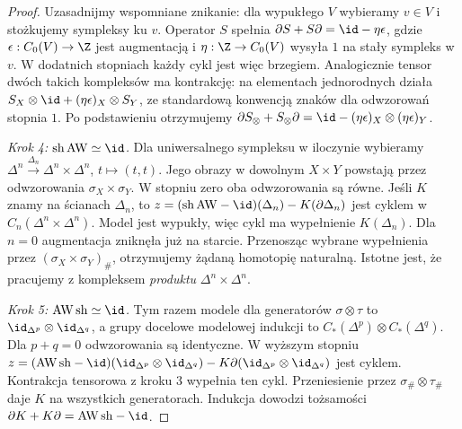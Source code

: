 \begin{proof}
Uzasadnijmy wspomniane znikanie: dla wypukłego $V$ wybieramy
$v\in V$ i stożkujemy sympleksy ku $v$. Operator $S$ spełnia
$\partial S+S\partial=\id-\eta\epsilon$, gdzie
$\epsilon:C_0(V)\to\Z$ jest augmentacją i
$\eta:\Z\to C_0(V)$ wysyła $1$ na stały sympleks w $v$.
W dodatnich stopniach każdy cykl jest więc brzegiem.
Analogicznie tensor dwóch takich kompleksów ma kontrakcję:
na elementach jednorodnych działa
$S_X\otimes\id+(\eta\epsilon)_X\otimes S_Y$,
ze standardową konwencją znaków dla odwzorowań stopnia $1$.
Po podstawieniu otrzymujemy
$\partial S_{\otimes}+S_{\otimes}\partial
=\id-(\eta\epsilon)_X\otimes(\eta\epsilon)_Y$.

\emph{Krok 4: $\mathrm{sh}\,\mathrm{AW}\simeq\id$.}
Dla uniwersalnego sympleksu w iloczynie wybieramy
$\Delta^n\xrightarrow{\Delta_n}\Delta^n\times\Delta^n$,
$t\mapsto(t,t)$. Jego obrazy w dowolnym $X\times Y$
powstają przez odwzorowania $\sigma_X\times\sigma_Y$.
W stopniu zero oba odwzorowania są równe. Jeśli $K$ znamy na
ścianach $\Delta_n$, to
$z=(\mathrm{sh}\,\mathrm{AW}-\id)(\Delta_n)-K(\partial\Delta_n)$
jest cyklem w $C_n(\Delta^n\times\Delta^n)$. Model jest
wypukły, więc cykl ma wypełnienie $K(\Delta_n)$.
Dla $n=0$ augmentacja zniknęła już na starcie.
Przenosząc wybrane wypełnienia przez
$(\sigma_X\times\sigma_Y)_\#$, otrzymujemy żądaną
homotopię naturalną. Istotne jest, że pracujemy z
kompleksem \emph{produktu} $\Delta^n\times\Delta^n$.

\emph{Krok 5: $\mathrm{AW}\,\mathrm{sh}\simeq\id$.}
Tym razem modele dla generatorów $\sigma\otimes\tau$ to
$\id_{\Delta^p}\otimes\id_{\Delta^q}$, a grupy docelowe
modelowej indukcji to
$C_*(\Delta^p)\otimes C_*(\Delta^q)$.
Dla $p+q=0$ odwzorowania są identyczne. W wyższym stopniu
$z=(\mathrm{AW}\,\mathrm{sh}-\id)
(\id_{\Delta^p}\otimes\id_{\Delta^q})-K\partial
(\id_{\Delta^p}\otimes\id_{\Delta^q})$ jest cyklem.
Kontrakcja tensorowa z kroku 3 wypełnia ten cykl.
Przeniesienie przez $\sigma_\#\otimes\tau_\#$ daje $K$
na wszystkich generatorach. Indukcja dowodzi tożsamości
$\partial K+K\partial=\mathrm{AW}\,\mathrm{sh}-\id$.
\end{proof}

